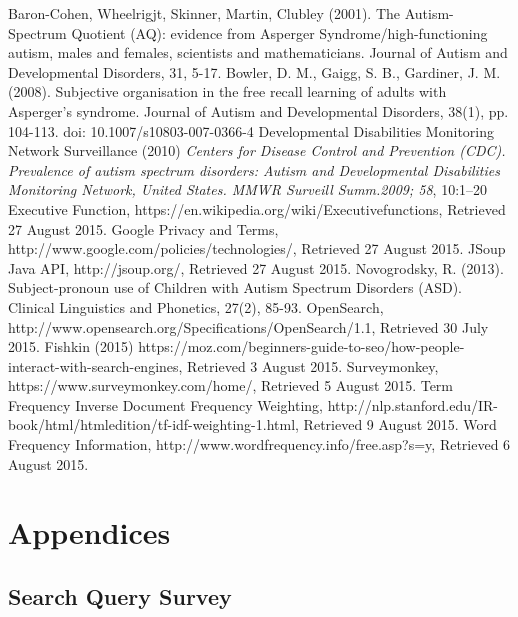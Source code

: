 \documentclass[a4paper, 11pt]{article}
\begin{document}
\clearpage
\begin{thebibliography}{100}
 Baron-Cohen, Wheelrigjt, Skinner, Martin, Clubley (2001).   The Autism-Spectrum Quotient (AQ): evidence from Asperger Syndrome/high-functioning autism, males and females, scientists and mathematicians.  Journal of Autism and Developmental Disorders, 31, 5-17.
 Bowler, D. M., Gaigg, S. B., Gardiner, J. M. (2008). Subjective organisation in the free recall learning of adults with Asperger's syndrome. Journal of Autism and Developmental Disorders, 38(1), pp. 104-113. doi: 10.1007/s10803-007-0366-4 
Developmental Disabilities Monitoring Network Surveillance (2010) \textit{Centers for Disease Control and Prevention (CDC). Prevalence of autism spectrum disorders: Autism and Developmental Disabilities Monitoring Network, United States. MMWR Surveill Summ.2009; 58}, 10:1–20
 Executive Function, https://en.wikipedia.org/wiki/Executivefunctions, Retrieved 27 August 2015.
 Google Privacy and Terms, http://www.google.com/policies/technologies/, Retrieved 27 August 2015.
 JSoup Java API, http://jsoup.org/, Retrieved 27 August 2015.
 Novogrodsky, R. (2013). Subject-pronoun use of Children with Autism Spectrum Disorders (ASD). Clinical Linguistics and Phonetics, 27(2), 85-93. 
OpenSearch, http://www.opensearch.org/Specifications/OpenSearch/1.1, Retrieved 30 July 2015.
 Fishkin (2015) https://moz.com/beginners-guide-to-seo/how-people-interact-with-search-engines, Retrieved 3 August 2015.
Surveymonkey, https://www.surveymonkey.com/home/, Retrieved 5 August 2015.
 Term Frequency Inverse Document Frequency Weighting, http://nlp.stanford.edu/IR-book/html/htmledition/tf-idf-weighting-1.html, Retrieved 9 August 2015.
 Word Frequency Information, http://www.wordfrequency.info/free.asp?s=y, Retrieved 6 August 2015.
\end{thebibliography}

\newpage
\section {Appendices}

\newpage
\subsection{Search Query Survey} \label{AppendixA}
\end{document}
